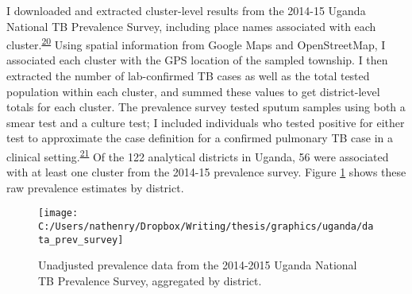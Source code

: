 \documentclass[
]{article}
\begin{document}
I downloaded and extracted cluster-level results from the 2014-15 Uganda National TB Prevalence Survey, including place names associated with each cluster.\textsuperscript{\protect\hyperlink{ref-UgandaMinistryofHealth2015}{20}} Using spatial information from Google Maps and OpenStreetMap, I associated each cluster with the GPS location of the sampled township. I then extracted the number of lab-confirmed TB cases as well as the total tested population within each cluster, and summed these values to get district-level totals for each cluster. The prevalence survey tested sputum samples using both a smear test and a culture test; I included individuals who tested positive for either test to approximate the case definition for a confirmed pulmonary TB case in a clinical setting.\textsuperscript{\protect\hyperlink{ref-UgandaNationalTuberculosisandLeprosyProgramme2017}{21}} Of the 122 analytical districts in Uganda, 56 were associated with at least one cluster from the 2014-15 prevalence survey. Figure \ref{fig:data-prev-survey} shows these raw prevalence estimates by district.

\begin{figure}[!ht]

{\centering \texttt{[image: C:/Users/nathenry/Dropbox/Writing/thesis/graphics/uganda/data\_prev\_survey]} 

}

\caption{Unadjusted prevalence data from the 2014-2015 Uganda National TB Prevalence Survey, aggregated by district.}\label{fig:data-prev-survey}
\end{figure}
\end{document}
